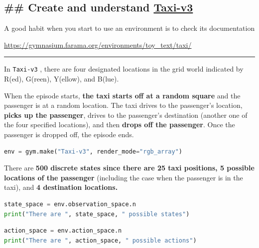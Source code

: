\documentclass[11pt,a4paper]{article}
\begin{document}
\subsection{\texorpdfstring{\#\# Create and understand \href{https://gymnasium.farama.org/environments/toy_text/taxi/}{Taxi-v3}}{\#\# Create and understand Taxi-v3}}\label{create-and-understand-taxi-v3}

A good habit when you start to use an environment is to check its documentation

\url{https://gymnasium.farama.org/environments/toy_text/taxi/}

\begin{center}\rule{0.5\linewidth}{0.5pt}\end{center}

In \passthrough{\lstinline!Taxi-v3!} , there are four designated locations in the grid world indicated by R(ed), G(reen), Y(ellow), and B(lue).

When the episode starts, \textbf{the taxi starts off at a random square} and the passenger is at a random location. The taxi drives to the passenger's location, \textbf{picks up the passenger}, drives to the passenger's destination (another one of the four specified locations), and then \textbf{drops off the passenger}. Once the passenger is dropped off, the episode ends.


\begin{lstlisting}[language=Python]
env = gym.make("Taxi-v3", render_mode="rgb_array")
\end{lstlisting}

There are \textbf{500 discrete states since there are 25 taxi positions, 5 possible locations of the passenger} (including the case when the passenger is in the taxi), and \textbf{4 destination locations.}

\begin{lstlisting}[language=Python]
state_space = env.observation_space.n
print("There are ", state_space, " possible states")
\end{lstlisting}

\begin{lstlisting}[language=Python]
action_space = env.action_space.n
print("There are ", action_space, " possible actions")
\end{lstlisting}
\end{document}
